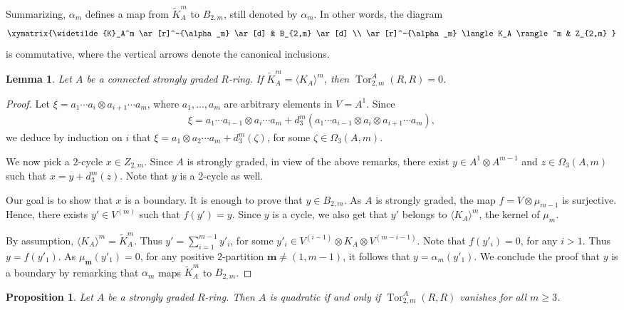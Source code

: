 \documentclass[pdftex]{sigma}
\newcommand{\bs}[1]{\boldsymbol{#1}}
\DeclareMathOperator{\Tor}{Tor}
\newcommand\ot{\otimes}
\newcommand{\gen}[1]{\langle #1 \rangle}
\newcommand{\Od}[2]{\Omega_{#1}(#2)}
\renewcommand{\^}[1]{\mbox{$^{\left( #1 \right)}$}}
\renewcommand{\_}[1]{\mbox{$_{\left( #1 \right)}$}}
\numberwithin{equation}{section}
\newtheorem{Lemma}[Theorem]{Lemma}
\newtheorem{Proposition}[Theorem]{Proposition}
{ \theoremstyle{definition}
\newtheorem{Definition}[Theorem]{Definition}
\newtheorem{Remark}[Theorem]{Remark}
}
\begin{document}
Summarizing, $\alpha_m$ def\/ines a map from $\widetilde{K}_A^m$ to $B_{2,m}$, still denoted by $\alpha_m$. In other words, the diagram
\begin{gather*}
 \xymatrix{\widetilde{K}_A^m \ar[r]^-{\alpha_m} \ar[d] & B_{2,m} \ar[d] \\
 \ar[r]^-{\alpha_m} \gen{K_A}^m & Z_{2,m}
 }
\end{gather*}
is commutative, where the vertical arrows denote the canonical inclusions.
\begin{Lemma}
 Let $A$ be a connected strongly graded $R$-ring. If $\widetilde{K}_A^m {=} \gen{K_A}^m\!$, then $\Tor_{2,m}^A(R,R){=}0$.
\end{Lemma}
\begin{proof}
 Let $\xi= a_1\cdots a_{i}\ot a_{i+1}\cdots a_{m}$, where $a_1,\dots,a_m$ are arbitrary elements in $ V=A^1$. Since
\begin{gather*}
\xi=a_1\cdots a_{i-1}\ot a_{i}\cdots a_{m}+d_3^m( a_1\cdots a_{i-1}\ot a_{i}\ot a_{i+1}\cdots a_{m}),
\end{gather*}
we deduce by induction on $i$ that $\xi=a_1\ot a_2\cdots a_m+d_3^m(\zeta)$, for some $\zeta\in \Od{3}{A,m}$.

We now pick a $2$-cycle $x\in Z_{2,m}$. Since $A$ is strongly graded, in view of the above remarks, there exist $y\in A^1\ot A^{m-1}$ and $z\in\Od{3}{A,m}$ such that $x=y+d_3^m(z)$. Note that $y$ is a $2$-cycle as well.

Our goal is to show that $x$ is a boundary. It is enough to prove that $y\in B_{2,m}$. As $A$ is strongly graded, the map $f= V\ot \mu_{m-1}$ is surjective. Hence, there exists $y'\in V^{(m)}$ such that $f(y')=y$. Since $y$ is a cycle, we also get that $y'$ belongs to $\gen{K_A}^m$, the kernel of $\mu_m$.

By assumption, $\gen{K_A}^m=\widetilde{K}_A^m$. Thus $y'=\sum\limits_{i=1}^{m-1}y'_i$, for some $y'_i\in V^{(i-1)}\ot K_A\ot V^{(m-i-1)}$. Note that $f(y'_i)=0$, for any $i>1$. Thus $y=f(y'_1)$. As $\mu_{\bs{m}}(y'_1)=0$, for any positive $2$-partition $\bs{m}\neq(1,m-1)$, it follows that $y=\alpha_m(y'_1)$. We conclude the proof that $y$ is a boundary by remarking that $\alpha_m$ maps $\widetilde{K}_A^m$ to $B_{2,m}$.
\end{proof}

\begin{Proposition} \label{prop:quadcoring} Let $A$ be a strongly graded $R$-ring. Then $A$ is quadratic if and only if $\operatorname{Tor}_{2,m}^A(R,R)$ vanishes for all $m \geq 3$.
\end{Proposition}
\end{document}
